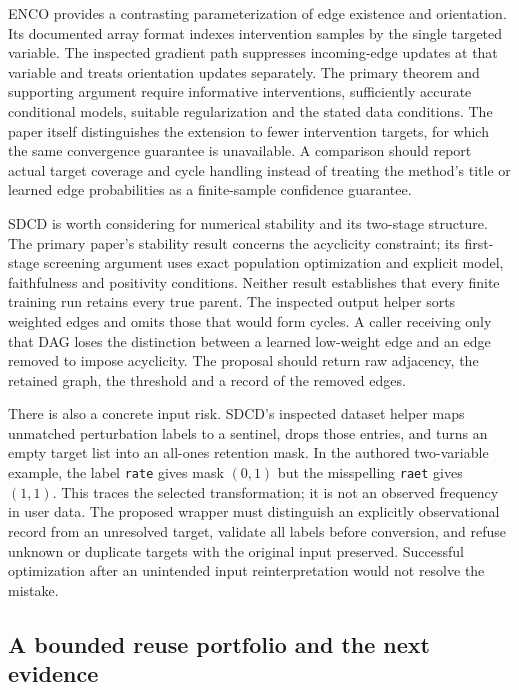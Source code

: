 ENCO provides a contrasting parameterization of edge existence and
orientation. Its documented array format indexes intervention samples by
the single targeted variable. The inspected gradient path suppresses
incoming-edge updates at that variable and treats orientation updates
separately. The primary theorem and supporting argument require informative
interventions, sufficiently accurate conditional models, suitable
regularization and the stated data conditions. The paper itself distinguishes
the extension to fewer intervention targets, for which the same convergence
guarantee is unavailable. A comparison should report actual target coverage
and cycle handling instead of treating the method's title or learned edge
probabilities as a finite-sample confidence guarantee.
\citep{exec14_pt_enco,exec14_pt_paper_enco}

SDCD is worth considering for numerical stability and its two-stage
structure. The primary paper's stability result concerns the acyclicity
constraint; its first-stage screening argument uses exact population
optimization and explicit model, faithfulness and positivity conditions.
Neither result establishes that every finite training run retains every
true parent. The inspected output helper sorts weighted edges and omits
those that would form cycles. A caller receiving only that DAG loses the
distinction between a learned low-weight edge and an edge removed to impose
acyclicity. The proposal should return raw adjacency, the retained graph,
the threshold and a record of the removed edges.
\citep{exec14_pt_paper_sdcd,exec14_pt_sdcd}

There is also a concrete input risk. SDCD's inspected dataset helper maps
unmatched perturbation labels to a sentinel, drops those entries, and
turns an empty target list into an all-ones retention mask. In the authored
two-variable example, the label \texttt{rate} gives mask $(0,1)$ but the
misspelling \texttt{raet} gives $(1,1)$. This traces the selected transformation;
it is not an observed frequency in user data. The proposed wrapper must
distinguish an explicitly observational record from an unresolved target,
validate all labels before conversion, and refuse unknown or duplicate
targets with the original input preserved. Successful optimization after
an unintended input reinterpretation would not resolve the mistake.
\citep{exec14_pt_sdcd,exec14_pt_exact}

\subsection{A bounded reuse portfolio and the next evidence}

